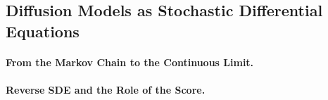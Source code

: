 \subsection{Diffusion Models as Stochastic Differential Equations}

\paragraph{From the Markov Chain to the Continuous Limit.}

\paragraph{Reverse SDE and the Role of the Score.}
